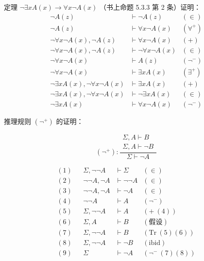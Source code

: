 \documentclass[UTF8]{ctexart}
\begin{document}
    定理 $\lnot \exists x A(x) \to \forall x \lnot A(x)$ （书上命题 5.3.3 第 2 条）证明：
    \begin{align*}
        \lnot A(z) & \vdash \lnot A(z) & (\in) \\
        \lnot A(z) & \vdash \forall x \lnot A(x) & (\forall^{+}) \\
        \lnot \forall x \lnot A(x), \lnot A(z) & \vdash \forall x \lnot A(x) & (+) \\
        \lnot \forall x \lnot A(x), \lnot A(z) & \vdash \lnot \forall x \lnot A(x) & (\in) \\
        \lnot \forall x \lnot A(x) & \vdash A(z) & (\lnot^{-}) \\
        \lnot \forall x \lnot A(x) & \vdash \exists x A(x) & (\exists^{+}) \\
        \lnot \exists x A(x), \lnot \forall x \lnot A(x) & \vdash \exists x A(x) & (+) \\
        \lnot \exists x A(x), \lnot \forall x \lnot A(x) & \vdash \lnot \exists x A(x) & (\in) \\
        \lnot \exists x A(x) & \vdash \forall x \lnot A(x) & (\lnot^{-})
    \end{align*}

    推理规则 $(\lnot^{+})$ 的证明：

    \begin{equation*}
        (\lnot^{+}): \dfrac{\begin{matrix}\Sigma, A \vdash B \\ \Sigma, A \vdash \lnot B \end{matrix}}{\Sigma \vdash \lnot A}
    \end{equation*}

    \begin{align*}
        (1) && \Sigma, \lnot \lnot A & \vdash \Sigma & (\in) \\
        (2) && \lnot \lnot A, \lnot A & \vdash \lnot \lnot A & (\in) \\
        (3) && \lnot \lnot A, \lnot A & \vdash \lnot A & (\in) \\
        (4) && \lnot \lnot A & \vdash A & (\lnot^{-}) \\
        (5) && \Sigma, \lnot \lnot A & \vdash A & (+\ (4)) \\
        (6) && \Sigma, A & \vdash B & (\text{假设}) \\
        (7) && \Sigma, \lnot \lnot A & \vdash B & (\mathrm{Tr}\ (5)(6)) \\
        (8) && \Sigma, \lnot \lnot A & \vdash \lnot B & (\mathrm{ibid}) \\
        (9) && \Sigma & \vdash \lnot A & (\lnot^{-}\ (7)(8))
    \end{align*}
\end{document}

